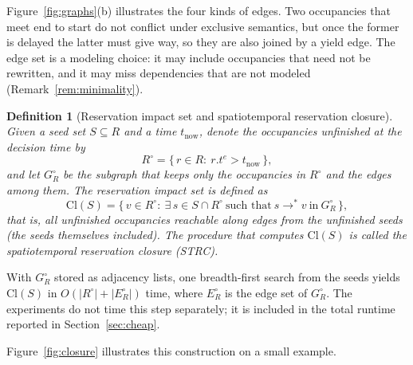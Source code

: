 \documentclass[manuscript,screen,review]{acmart}
\providecommand{\STRC}{\textsc{STRC}}
\newtheorem{definition}{Definition}
\begin{document}
Figure~\ref{fig:graphs}(b) illustrates the four kinds of edges. Two occupancies that meet end to start do not conflict under exclusive semantics,
but once the former is delayed the latter must give way, so they are also joined by a yield edge.
The edge set is a modeling choice: it may include occupancies that need not be rewritten, and it may miss dependencies that are not modeled (Remark~\ref{rem:minimality}).

\begin{definition}[Reservation impact set and spatiotemporal reservation closure]
\label{def:strc}
Given a seed set \(S\subseteq R\) and a time \(t_{\mathrm{now}}\), denote the occupancies unfinished at the decision time by
\[
R^{\circ}=\bigl\{\,r\in R:\ r.t^e>t_{\mathrm{now}}\,\bigr\},
\]
and let \(G_R^\circ\) be the subgraph that keeps only the occupancies in \(R^{\circ}\) and the edges among them. The reservation impact set is defined as
\[
\mathrm{Cl}(S)
=\bigl\{\,v\in R^{\circ}:\
\exists\,s\in S\cap R^{\circ}\ \text{such that}\ s\!\to^*\!v\ \text{in}\ G_R^\circ\,\bigr\},
\]
that is, all unfinished occupancies reachable along edges from the unfinished seeds (the seeds themselves included).
The procedure that computes \(\mathrm{Cl}(S)\) is called the spatiotemporal reservation closure (\STRC).
\end{definition}

With \(G_R^\circ\) stored as adjacency lists, one breadth-first search from the seeds yields \(\mathrm{Cl}(S)\) in
\(O(|R^{\circ}|+|E_R^{\circ}|)\) time, where \(E_R^{\circ}\) is the edge set of \(G_R^\circ\).
The experiments do not time this step separately; it is included in the total runtime reported in Section~\ref{sec:cheap}.

Figure~\ref{fig:closure} illustrates this construction on a small example.
\end{document}
